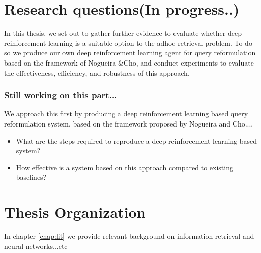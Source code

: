 \section{Research questions(In progress..)}
In this thesis, we set out to gather further evidence to evaluate whether deep reinforcement learning is a suitable option to the adhoc retrieval problem. To do so we produce our own deep reinforcement learning agent for query reformulation based on the framework of Nogueira \&Cho, and conduct experiments to evaluate the effectiveness, efficiency, and robustness of this approach. 



\subsubsection{Still working on this part...}


We approach this first by producing a deep reinforcement learning based query reformulation system, based on the framework proposed by Nogueira and Cho\cite{nogueira2017task}....

%
%


\begin{itemize}
	\item What are the steps required to reproduce a deep reinforcement learning based system?
	\item How effective is a system based on this approach compared to existing baselines?
\end{itemize}




\section{Thesis Organization}
In chapter \ref{chap:lit} we provide relevant background on information retrieval and neural networks...etc


